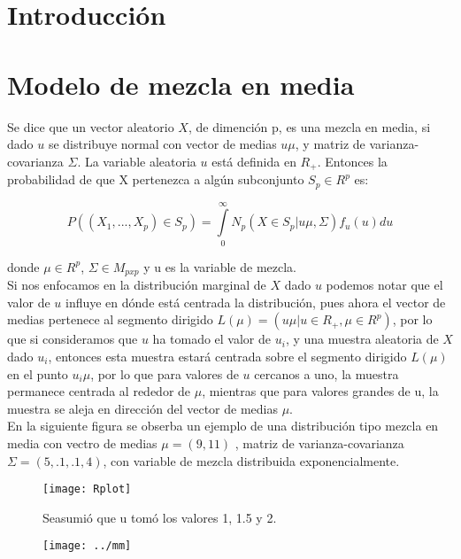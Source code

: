 \documentclass[11pt]{book}
\begin{document}
\chapter*{Introducción} 
\chapter*{Modelo de mezcla en media}
Se dice que un vector aleatorio $X$, de dimención p, es una mezcla en media, si dado $u$ se distribuye normal con vector de  medias $u\mu$, y matriz de varianza-covarianza $\Sigma$. La variable aleatoria $u$ está definida en $R_{+}$. Entonces la probabilidad de que X pertenezca a algún subconjunto $S_{p}\in R^{p}$ es:

\begin{equation*}
  P((X_{1},...,X_{p})\in S_{p})=\underset{0}{\overset{\infty }{\int }}N_{p}(X \in S_{p} |u\mu,\Sigma)f_{u}(u)du 
\end{equation*}


 donde  $\mu \in R^{p}$, $\Sigma \in M_{pxp}$ y u es la variable de mezcla.\\

Si nos enfocamos en la distribución marginal de $X$ dado $u$ podemos notar que el valor de $u$ influye en dónde está centrada la distribución, pues ahora el vector de medias pertenece al segmento dirigido $L(\mu)=( u\mu | u\in R_{+}, \mu\in R^{p})$, por lo que si consideramos que $u$ ha tomado el valor de $u_{i}$, y una muestra aleatoria de $X$ dado $u_{i}$, entonces esta muestra estará centrada sobre el segmento dirigido $L(\mu)$ en el punto $u_{i}\mu$, por lo que para valores de $u$ cercanos a uno, la muestra permanece centrada al rededor de $\mu$, mientras que para valores grandes de u, la muestra se aleja en dirección del vector de medias $\mu$. \\


En la siguiente figura se obserba un ejemplo de una distribución tipo mezcla en media con vectro de medias $\mu=(9,11)$ , matriz de varianza-covarianza $\Sigma=(5,.1,.1,4)$, con variable de mezcla distribuida exponencialmente.\\

\begin{figure*}[!]
\centering
\texttt{[image: Rplot]}
\caption{Seasumió que u tomó los valores 1, 1.5 y 2.}
\end{figure*}

\pagebreak
\begin{figure}[!]
\centering
\texttt{[image: ../mm]}
\caption{}
\label{fig:mm}
\end{figure}
\end{document}
